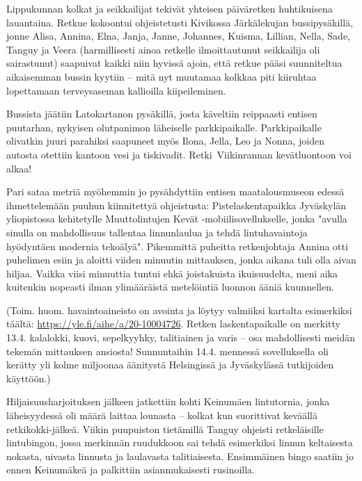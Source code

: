 \begin{multicols}{2}

	Lippukunnan kolkat ja seikkailijat tekivät yhteisen päiväretken
	huhtikuisena lauantaina. Retkue kokoontui ohjeistetusti Kivikossa
	Järkälekujan bussipysäkillä, jonne Alisa, Annina, Elna, Janja, Janne,
	Johannes, Kuisma, Lillian, Nella, Sade, Tanguy ja Veera (harmillisesti
	ainoa retkelle ilmoittautunut seikkailija oli sairastunut) saapuivat
	kaikki niin hyvissä ajoin, että retkue pääsi suunniteltua aikaisemman
	bussin kyytiin – mitä nyt muutamaa kolkkaa piti kiiruhtaa lopettamaan
	terveysaseman kallioilla kiipeileminen.

	Bussista jäätiin Latokartanon pysäkillä, josta käveltiin reippaasti
	entisen puutarhan, nykyisen olutpanimon läheiselle parkkipaikalle.
	Parkkipaikalle olivatkin juuri parahiksi saapuneet myös Ilona, Jella,
	Leo ja Nonna, joiden autosta otettiin kantoon vesi ja tiskivadit.
	\mbox{Retki Viikinrannan} kevätluontoon voi \mbox{alkaa!}

	Pari sataa metriä myöhemmin jo pysähdyttiin entisen maatalousmuseon
	edessä ihmettelemään puuhun kiinnitettyä ohjeistusta:
	Pistelaskentapaikka Jyväskylän yliopistossa kehitetylle Muuttolintujen
	Kevät -mobiilisovellukselle, jonka "avulla sinulla on mahdollisuus
	tallentaa linnunlaulua ja tehdä lintuhavaintoja hyödyntäen modernia
	tekoälyä". Pikemmittä puheitta retkenjohtaja Annina otti puhelimen
	esiin ja aloitti viiden minuutin mittauksen, jonka aikana tuli olla
	aivan hiljaa. Vaikka viisi minuuttia tuntui ehkä joistakuista
	ikuisuudelta, meni aika kuitenkin nopeasti ilman ylimääräistä
	metelöintiä luonnon ääniä kuunnellen.

	\columnbreak

	(Toim. huom. havaintoaineisto on avointa ja löytyy valmiiksi kartalta
	esimerkiksi täältä:
	\href{https://yle.fi/aihe/a/20-10004726}{https://yle.fi/aihe/a/20-10004726}.
	Retken laskentapaikalle on merkitty 13.4. kalalokki, kuovi,
	sepelkyyhky, talitiainen ja varis – osa mahdollisesti meidän tekemän
	mittauksen ansiosta! Sunnuntaihin 14.4. mennessä sovelluksella oli
	kerätty yli kolme miljoonaa äänitystä Helsingissä ja Jyväskylässä
	tutkijoiden käyttöön.)

	Hiljaisuusharjoituksen jälkeen jatkettiin kohti Keinumäen lintutornia,
	jonka läheisyydessä oli määrä laittaa lounasta – kolkat kun suorittivat
	keväällä retkikokki-jälkeä. Viikin puupuiston tietämillä Tanguy
	ohjeisti retkeläisille lintubingon, jossa merkinnän ruudukkoon sai
	tehdä esimerkiksi linnun keltaisesta nokasta, uivasta linnusta ja
	laulavasta talitiaisesta. Ensimmäinen bingo saatiin jo ennen Keinumäkeä
	ja palkittiin asianmukaisesti rusinoilla.


\end{multicols}

